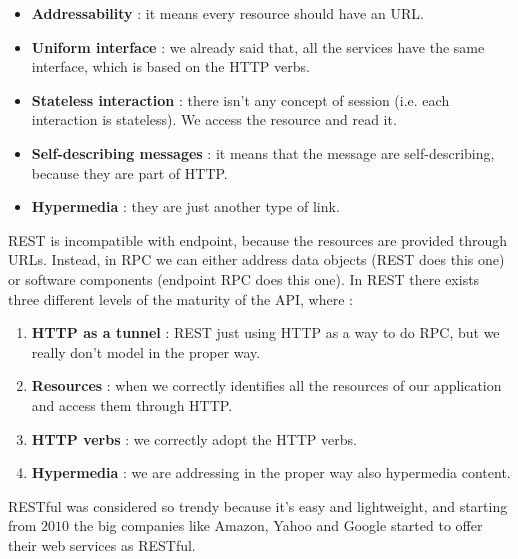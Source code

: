 \begin{itemize}
    \item \textbf{Addressability} : it means every resource should have an URL.
    \item \textbf{Uniform interface} : we already said that, all the services have the same interface, which is based on the HTTP verbs.
    \item \textbf{Stateless interaction} : there isn't any concept of session (i.e. each interaction is stateless). We access the resource and read it.
    \item \textbf{Self-describing messages} : it means that the message are self-describing, because they are part of HTTP.
    \item \textbf{Hypermedia} : they are just another type of link.
\end{itemize}
REST is incompatible with endpoint, because the resources are provided through URLs. Instead, in RPC we can either address data objects (REST does this one) or software components (endpoint RPC does this one). In REST there exists three different levels of the maturity of the API, where :
\begin{enumerate}
    \item \textbf{HTTP as a tunnel} : REST just using HTTP as a way to do RPC, but we really don't model in the proper way.
    \item \textbf{Resources} : when we correctly identifies all the resources of our application and access them through HTTP.
    \item \textbf{HTTP verbs} : we correctly adopt the HTTP verbs.
    \item \textbf{Hypermedia} : we are addressing in the proper way also hypermedia content.
\end{enumerate}
RESTful was considered so trendy because it's easy and lightweight, and starting from $2010$ the big companies like Amazon, Yahoo and Google started to offer their web services as RESTful.
